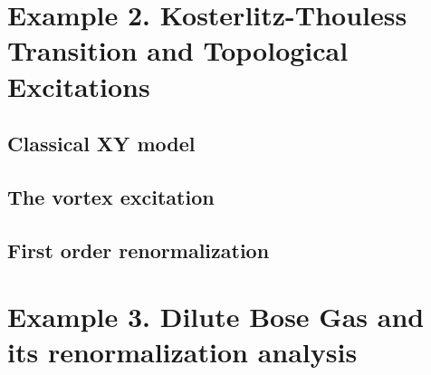 \documentclass{article}
\begin{document}
\section{Example 2. Kosterlitz-Thouless Transition and Topological Excitations}
\subsection{Classical XY model}

\subsection{The vortex excitation}

\subsection{First order renormalization}

\section{Example 3. Dilute Bose Gas and its renormalization analysis}
\end{document}
